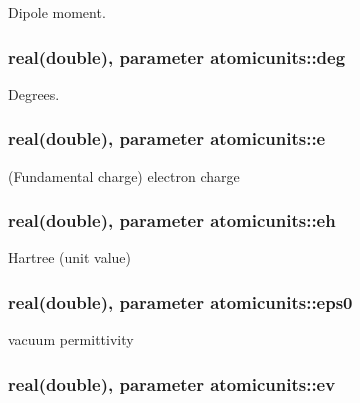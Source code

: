 Dipole moment. 

\hypertarget{classatomicunits_af9552fc54f3050b11cce6152261c2bf2}{
\subsubsection[{deg}]{\setlength{\rightskip}{0pt plus 5cm}real(double), parameter atomicunits\+::deg}}\label{classatomicunits_af9552fc54f3050b11cce6152261c2bf2}


Degrees. 

\hypertarget{classatomicunits_af3650eaf423c8af5e887256a5e8023d6}{
\subsubsection[{e}]{\setlength{\rightskip}{0pt plus 5cm}real(double), parameter atomicunits\+::e}}\label{classatomicunits_af3650eaf423c8af5e887256a5e8023d6}


(Fundamental charge) electron charge 

\hypertarget{classatomicunits_a39b85d20ed96ab0b9dfb86c7646a61a0}{
\subsubsection[{eh}]{\setlength{\rightskip}{0pt plus 5cm}real(double), parameter atomicunits\+::eh}}\label{classatomicunits_a39b85d20ed96ab0b9dfb86c7646a61a0}


Hartree (unit value) 

\hypertarget{classatomicunits_a45821c6127c356d71ba94bf34b962653}{
\subsubsection[{eps0}]{\setlength{\rightskip}{0pt plus 5cm}real(double), parameter atomicunits\+::eps0}}\label{classatomicunits_a45821c6127c356d71ba94bf34b962653}


vacuum permittivity 

\hypertarget{classatomicunits_a10a69964ce0d082d71ee5ae34a5a0d24}{
\subsubsection[{ev}]{\setlength{\rightskip}{0pt plus 5cm}real(double), parameter atomicunits\+::ev}}\label{classatomicunits_a10a69964ce0d082d71ee5ae34a5a0d24}


